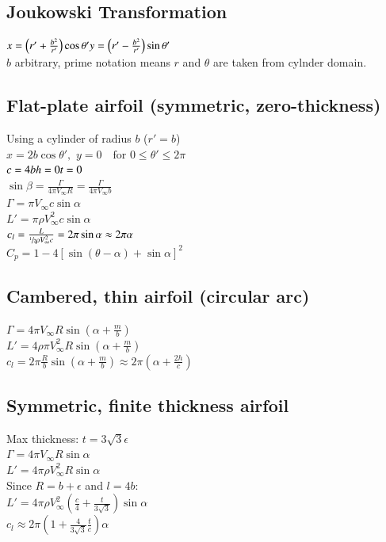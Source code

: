\subsection*{Joukowski Transformation}
$x=\left(r'+\frac{b^2}{r'}\right)\cos\theta'\hfill y=\left(r'-\frac{b^2}{r'}\right)\sin\theta'$\\
$b$ arbitrary, prime notation means $r$ and $\theta$ are taken from cylnder domain.
\subsection*{Flat-plate airfoil (symmetric, zero-thickness)}
Using a cylinder of radius $b$ ($r'=b$)\\
$x=2b\cos\theta',\,\,y=0\quad \text{for } 0\leq\theta'\leq2\pi$\\
$c=4b\hfill h=0\hfill t=0$\\
$\sin\beta=\frac{\Gamma}{4\pi V_\infty R}=\frac{\Gamma}{4\pi V_\infty b}$\\
$\Gamma = \pi V_\infty c\sin\alpha$\\
$L'=\pi\rho V_\infty^2 c\sin\alpha$\\
$c_l=\frac{L}{\sfrac{1}{2}\rho V_\infty^2 c}=2\pi\sin\alpha\approx2\pi\alpha$\\
$C_p=1-4\left[\sin(\theta-\alpha)+\sin\alpha\right]^2$
\subsection*{Cambered, thin airfoil (circular arc)}
$\Gamma=4\pi V_\infty R\sin\left(\alpha+\frac{m}{b}\right)$\\
$L'=4\rho\pi V_\infty^2 R\sin\left(\alpha+\frac{m}{b}\right)$\\
$c_l=2\pi\frac{R}{b}\sin\left(\alpha+\frac{m}{b}\right)\approx2\pi\left(\alpha+\frac{2h}{c}\right)$
\subsection*{Symmetric, finite thickness airfoil}
Max thickness: $t=3\sqrt{3}\epsilon$\hfill{}\\
$\Gamma=4\pi V_\infty R\sin\alpha$\\
$L'=4\pi\rho V_\infty^2 R\sin\alpha$\\
Since $R=b+\epsilon$ and $l=4b$:\\
$L'=4\pi\rho V_\infty^2\left(\frac{c}{4}+\frac{t}{3\sqrt{3}}\right)\sin\alpha$\\
$c_l\approx2\pi\left(1+\frac{4}{3\sqrt{3}}\frac{t}{c}\right)\alpha$
